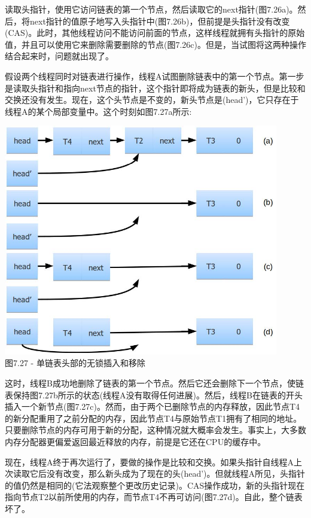 读取头指针，使用它访问链表的第一个节点，然后读取它的next指针(图7.26a)。然后，将next指针的值原子地写入头指针中(图7.26b)，但前提是头指针没有改变(CAS)。此时，其他线程访问不能访问前面的节点，这样线程就拥有头指针的原始值，并且可以使用它来删除需要删除的节点(图7.26c)。但是，当试图将这两种操作结合起来时，问题就出现了。

假设两个线程同时对链表进行操作，线程A试图删除链表中的第一个节点。第一步是读取头指针和指向next节点的指针，这个指针即将成为链表的新头，但是比较和交换还没有发生。现在，这个头节点是不变的，新头节点是(head')，它只存在于线程A的某个局部变量中。这个时刻如图7.27a所示:

\begin{center}
\includegraphics[width=0.9\textwidth]{content/2/chapter7/images/27.jpg}\\
图7.27 - 单链表头部的无锁插入和移除
\end{center}

这时，线程B成功地删除了链表的第一个节点。然后它还会删除下一个节点，使链表保持图7.27b所示的状态(线程A没有取得任何进展)。然后，线程B在链表的开头插入一个新节点(图7.27c)。然而，由于两个已删除节点的内存释放，因此节点T4的新分配重用了之前分配的内存，因此节点T4与原始节点T1拥有了相同的地址。只要删除节点的内存可用于新的分配，这种情况就大概率会发生。事实上，大多数内存分配器更偏爱返回最近释放的内存，前提是它还在CPU的缓存中。

现在，线程A终于再次运行了，要做的操作是比较和交换。如果头指针自线程A上次读取它后没有改变，那么新头成为了现在的头(head')。但就线程A所见，头指针的值仍然是相同的(它法观察整个更改历史记录)。CAS操作成功，新的头指针现在指向节点T2以前所使用的内存，而节点T4不再可访问(图7.27d)。自此，整个链表坏了。

